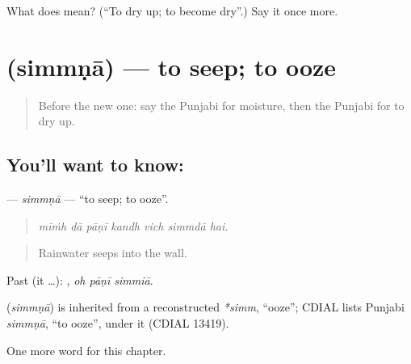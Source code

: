 \begin{tcolorbox}[breakable,colback=teal!4,colframe=teal!35!black,title={Before you move on}]
What does  mean? (\textquotedblleft{}To dry up; to become dry\textquotedblright{}.) Say it once more.
\end{tcolorbox}
\section[\texorpdfstring{\pa{ਸਿੰਮਣਾ} (simmṇā)}{ਸਿੰਮਣਾ (simmṇā)}]{ (simmṇā) — to seep; to ooze}

\label{lesson:PA-C292-simmna}



\begin{quote}
Before the new one: say the Punjabi for moisture, then the Punjabi for to dry up.
\end{quote}

\subsection*{You'll want to know: }
\textbf{} — \emph{simmṇā} — \textquotedblleft{}to seep; to ooze\textquotedblright{}.

\begin{quote}
      
\end{quote}

\begin{quote}
\emph{mīṁh dā pāṇī kandh vich simmdā hai.}
\end{quote}

\begin{quote}
Rainwater seeps into the wall.
\end{quote}

Past (it …):   , \emph{oh pāṇī simmiā}.

\begin{cousinweb}
\textbf{} (\emph{simmṇā}) is inherited from a reconstructed \emph{*simm}, \textquotedblleft{}ooze\textquotedblright{}; CDIAL lists Punjabi \emph{simmṇā}, \textquotedblleft{}to ooze\textquotedblright{}, under it (CDIAL 13419).
\end{cousinweb}

\begin{grammarlens}[title={What you've built}]
One more word for this chapter.
\end{grammarlens}

